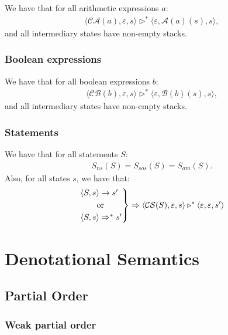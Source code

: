 \documentclass[a4paper, 12pt, twoside]{article}
\begin{document}
We have that for all arithmetic expressions $a$: \begin{gather*}
  \langle \mathcal{CA}(a), \varepsilon, s \rangle 
  \triangleright^*
  \langle \varepsilon, \mathcal{A}(a)(s), s \rangle,
\end{gather*} and all intermediary states have non-empty stacks.

\subsubsection{Boolean expressions}

We have that for all boolean expressions $b$: \begin{gather*}
  \langle \mathcal{CB}(b), \varepsilon, s \rangle 
  \triangleright^*
  \langle \varepsilon, \mathcal{B}(b)(s), s \rangle,
\end{gather*} and all intermediary states have non-empty stacks.

\subsubsection{Statements}

We have that for all statements $S$: \begin{gather*}
  S_{ns}(S) = S_{sos}(S) = S_{am}(S).
\end{gather*} Also, for all states $s$, we have that: \begin{gather*}
  \begin{rcases*}
    \langle S, s \rangle \to s' \\
    \qquad \text{or} \\
    \langle S, s \rangle \Rightarrow^* s'
  \end{rcases*} \Rightarrow
  \langle \mathcal{CS}(S), \varepsilon, s \rangle \triangleright^* 
  \langle \varepsilon, \varepsilon, s' \rangle 
\end{gather*}

\section{Denotational Semantics}

\subsection{Partial Order}

\subsubsection{Weak partial order}
\end{document}
